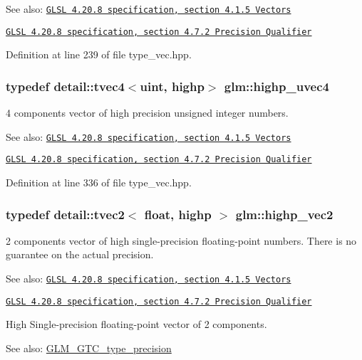 \begin{Desc}
\item[See also:]\href{http://www.opengl.org/registry/doc/GLSLangSpec.4.20.8.pdf}{\tt GLSL 4.20.8 specification, section 4.1.5 Vectors} 

\href{http://www.opengl.org/registry/doc/GLSLangSpec.4.20.8.pdf}{\tt GLSL 4.20.8 specification, section 4.7.2 Precision Qualifier} \end{Desc}


Definition at line 239 of file type\_\-vec.hpp.\hypertarget{group__core__precision_g7cb8cc501f7e680e1889b93eb80e6c46}{
\subsubsection[highp\_\-uvec4]{\setlength{\rightskip}{0pt plus 5cm}typedef detail::tvec4$<$uint, highp$>$ {\bf glm::highp\_\-uvec4}}}
\label{group__core__precision_g7cb8cc501f7e680e1889b93eb80e6c46}


4 components vector of high precision unsigned integer numbers.

\begin{Desc}
\item[See also:]\href{http://www.opengl.org/registry/doc/GLSLangSpec.4.20.8.pdf}{\tt GLSL 4.20.8 specification, section 4.1.5 Vectors} 

\href{http://www.opengl.org/registry/doc/GLSLangSpec.4.20.8.pdf}{\tt GLSL 4.20.8 specification, section 4.7.2 Precision Qualifier} \end{Desc}


Definition at line 336 of file type\_\-vec.hpp.\hypertarget{group__core__precision_g37645abcfcc1278567e99f1ca492bfbb}{
\subsubsection[highp\_\-vec2]{\setlength{\rightskip}{0pt plus 5cm}typedef detail::tvec2$<$ float, highp $>$ {\bf glm::highp\_\-vec2}}}
\label{group__core__precision_g37645abcfcc1278567e99f1ca492bfbb}


2 components vector of high single-precision floating-point numbers. There is no guarantee on the actual precision.

\begin{Desc}
\item[See also:]\href{http://www.opengl.org/registry/doc/GLSLangSpec.4.20.8.pdf}{\tt GLSL 4.20.8 specification, section 4.1.5 Vectors} 

\href{http://www.opengl.org/registry/doc/GLSLangSpec.4.20.8.pdf}{\tt GLSL 4.20.8 specification, section 4.7.2 Precision Qualifier}\end{Desc}
High Single-precision floating-point vector of 2 components. \begin{Desc}
\item[See also:]\hyperlink{group__gtc__type__precision}{GLM\_\-GTC\_\-type\_\-precision} \end{Desc}


